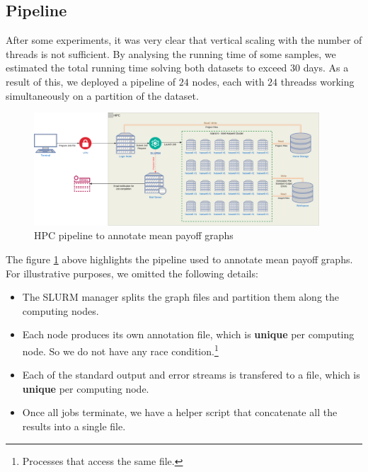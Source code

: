 \subsection{Pipeline}
After some experiments, it was very clear that vertical scaling with the number of threads is not sufficient. By analysing the running time of some samples, we estimated the total running time solving both datasets to exceed $30$ days.
\newline As a result of this, we deployed a pipeline of $24$ nodes, each with $24$ threadss working simultaneously on a partition of the dataset.
\begin{figure}
	\centering
	\includegraphics[width=0.95\textwidth]{Figures/DatasetAnnotation.png}
	\caption{HPC pipeline to annotate mean payoff graphs
	\label{fig:HPCAnnotation}}
\end{figure}
\FloatBarrier
The figure \ref{fig:HPCAnnotation} above highlights the pipeline used to annotate mean payoff graphs.
\newline For illustrative purposes, we omitted the following details:
\begin{itemize}
	\item The SLURM manager splits the graph files and partition them along the computing nodes.
	\item Each node produces its own annotation file, which is \textbf{unique} per computing node. So we do not have any race condition.\footnote{Processes that access the same file.} 
	\item Each of the standard output and error streams is transfered to a file, which is \textbf{unique} per computing node.
	\item Once all jobs terminate, we have a helper script that concatenate all the results into a single file.
\end{itemize} 

